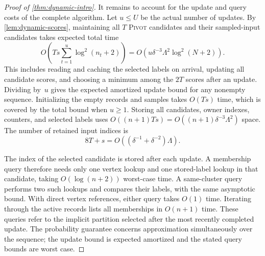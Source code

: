 \documentclass[11pt,letterpaper]{article}
\theoremstyle{definition}
\theoremstyle{remark}
\newcommand{\1}{\mathbf{1}}
\newcommand{\Pivot}{\textnormal{\textsc{Pivot}}}
\begin{document}
\begin{proof}[Proof of \cref{thm:dynamic-intro}]
It remains to account for the update and query costs of the complete algorithm.  Let $u\le U$ be the actual number of updates.  By \cref{lem:dynamic-scores}, maintaining all $T$ \Pivot{} candidates and their sampled-input candidates takes expected total time
\[
 O\!\left(Ts\sum_{t=1}^u\log^2(n_t+2)\right)
 =O\!\left(u\delta^{-3}\Lambda^2\log^2(N+2)\right).
\]
This includes reading and caching the selected labels on arrival, updating all candidate scores, and choosing a minimum among the $2T$ scores after an update.  Dividing by~$u$ gives the expected amortized update bound for any nonempty sequence.  Initializing the empty records and samples takes $O(Ts)$ time, which is covered by the total bound when $u\ge1$.  Storing all candidates, owner indexes, counters, and selected labels uses $O((n+1)Ts)=O((n+1)\delta^{-3}\Lambda^2)$ space.  The number of retained input indices is
\[
 8T+s=O\!\left((\delta^{-1}+\delta^{-2})\Lambda\right).
\]

The index of the selected candidate is stored after each update.  A membership query therefore needs only one vertex lookup and one stored-label lookup in that candidate, taking $O(\log(n+2))$ worst-case time.  A same-cluster query performs two such lookups and compares their labels, with the same asymptotic bound.  With direct vertex references, either query takes $O(1)$ time.  Iterating through the active records lists all memberships in $O(n+1)$ time.  These queries refer to the implicit partition selected after the most recently completed update.  The probability guarantee concerns approximation simultaneously over the sequence; the update bound is expected amortized and the stated query bounds are worst case.
\end{proof}



\end{document}
